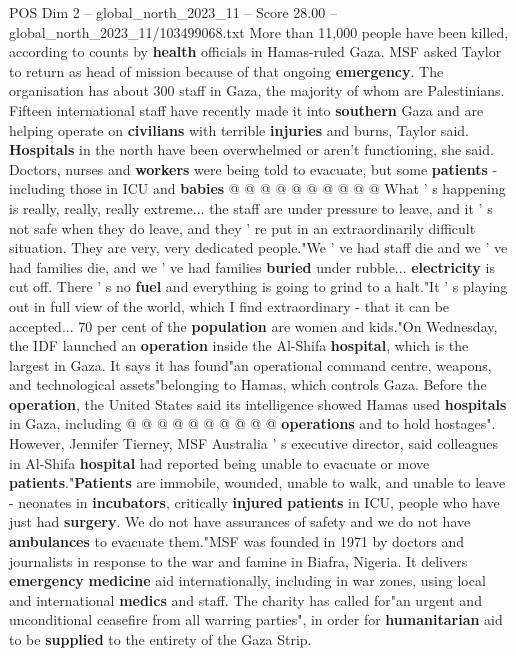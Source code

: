 \begin{textsample}{POS Dim 2 – global\_north\_2023\_11 – Score 28.00 – global\_north\_2023\_11/103499068.txt}
More than 11,000 people have been killed, according to counts by \textbf{health} officials in Hamas-ruled Gaza.
MSF asked Taylor to return as head of mission because of that ongoing \textbf{emergency}.
The organisation has about 300 staff in Gaza, the majority of whom are Palestinians.
Fifteen international staff have recently made it into \textbf{southern} Gaza and are helping operate on \textbf{civilians} with terrible \textbf{injuries} and burns, Taylor said. \textbf{Hospitals} in the north have been overwhelmed or aren't functioning, she said.
Doctors, nurses and \textbf{workers} were being told to evacuate, but some \textbf{patients} - including those in ICU and \textbf{babies} @ @ @ @ @ @ @ @ @ @ What ' s happening is really, really, really extreme... the staff are under pressure to leave, and it ' s not safe when they do leave, and they ' re put in an extraordinarily difficult situation.
They are very, very dedicated people."We ' ve had staff die and we ' ve had families die, and we ' ve had families \textbf{buried} under rubble... \textbf{electricity} is cut off.
There ' s no \textbf{fuel} and everything is going to grind to a halt."It ' s playing out in full view of the world, which I find extraordinary - that it can be accepted... 70 per cent of the \textbf{population} are women and kids."On Wednesday, the IDF launched an \textbf{operation} inside the Al-Shifa \textbf{hospital}, which is the largest in Gaza.
It says it has found"an operational command centre, weapons, and technological assets"belonging to Hamas, which controls Gaza.
Before the \textbf{operation}, the United States said its intelligence showed Hamas used \textbf{hospitals} in Gaza, including @ @ @ @ @ @ @ @ @ @ \textbf{operations} and to hold hostages".
However, Jennifer Tierney, MSF Australia ' s executive director, said colleagues in Al-Shifa \textbf{hospital} had reported being unable to evacuate or move \textbf{patients}."\textbf{Patients} are immobile, wounded, unable to walk, and unable to leave - neonates in \textbf{incubators}, critically \textbf{injured} \textbf{patients} in ICU, people who have just had \textbf{surgery}.
We do not have assurances of safety and we do not have \textbf{ambulances} to evacuate them."MSF was founded in 1971 by doctors and journalists in response to the war and famine in Biafra, Nigeria.
It delivers \textbf{emergency} \textbf{medicine} aid internationally, including in war zones, using local and international \textbf{medics} and staff.
The charity has called for"an urgent and unconditional ceasefire from all warring parties", in order for \textbf{humanitarian} aid to be \textbf{supplied} to the entirety of the Gaza Strip.

\end{textsample}
